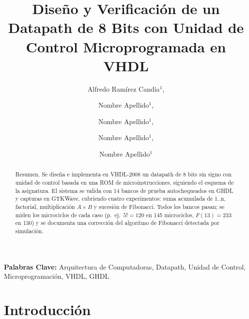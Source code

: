 \documentclass[llncs]{llncs}
\begin{document}
\title{Diseño y Verificación de un Datapath de 8 Bits con Unidad de Control Microprogramada en {VHDL}}

\author{Alfredo Ramírez Candia$^{1}$,%
\and Nombre Apellido$^{1}$,%
\and Nombre Apellido$^{1}$,%
\and Nombre Apellido$^{1}$,%
\and Nombre Apellido$^{1}$}


\maketitle

\begin{abstract}
Resumen. Se diseña e implementa en VHDL-2008 un datapath de 8 bits sin
signo con unidad de control basada en una ROM de microinstrucciones,
siguiendo el esquema de la asignatura. El sistema se valida con 14 bancos
de prueba autochequeados en GHDL y capturas en GTKWave, cubriendo cuatro
experimentos: suma acumulada de 1..n, factorial, multiplicación $A \times
B$ y sucesión de Fibonacci. Todos los bancos pasan; se miden los
microciclos de cada caso (p.\ ej.\ $5! = 120$ en 145 microciclos,
$F(13) = 233$ en 130) y se documenta una corrección del algoritmo de
Fibonacci detectada por simulación.
\end{abstract}

\noindent\textbf{Palabras Clave:} Arquitectura de Computadoras, Datapath,
Unidad de Control, Microprogramación, VHDL, GHDL

\section{Introducción}
\label{sec:intro}
\end{document}
